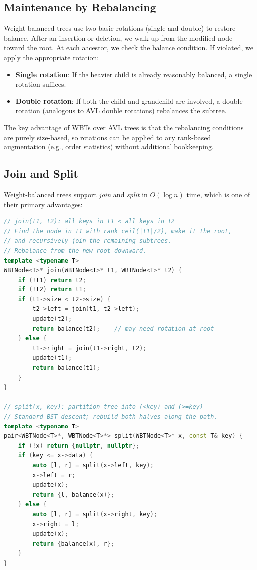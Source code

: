 \subsection{Maintenance by Rebalancing}
\label{sec:wbt-maintenance}

Weight-balanced trees use two basic rotations (single and double) to restore balance. After an insertion or deletion, we walk up from the modified node toward the root. At each ancestor, we check the balance condition. If violated, we apply the appropriate rotation:

\begin{itemize}
    \item \textbf{Single rotation}: If the heavier child is already reasonably balanced, a single rotation suffices.
    \item \textbf{Double rotation}: If both the child and grandchild are involved, a double rotation (analogous to AVL double rotations) rebalances the subtree.
\end{itemize}

The key advantage of WBTs over AVL trees is that the rebalancing conditions are purely size-based, so rotations can be applied to any rank-based augmentation (e.g., order statistics) without additional bookkeeping.

\subsection{Join and Split}
\label{sec:wbt-join-split}

Weight-balanced trees support \emph{join} and \emph{split} in $O(\log n)$ time, which is one of their primary advantages:

\begin{lstlisting}[language=C++]
// join(t1, t2): all keys in t1 < all keys in t2
// Find the node in t1 with rank ceil(|t1|/2), make it the root,
// and recursively join the remaining subtrees.
// Rebalance from the new root downward.
template <typename T>
WBTNode<T>* join(WBTNode<T>* t1, WBTNode<T>* t2) {
    if (!t1) return t2;
    if (!t2) return t1;
    if (t1->size < t2->size) {
        t2->left = join(t1, t2->left);
        update(t2);
        return balance(t2);    // may need rotation at root
    } else {
        t1->right = join(t1->right, t2);
        update(t1);
        return balance(t1);
    }
}

// split(x, key): partition tree into (<key) and (>=key)
// Standard BST descent; rebuild both halves along the path.
template <typename T>
pair<WBTNode<T>*, WBTNode<T>*> split(WBTNode<T>* x, const T& key) {
    if (!x) return {nullptr, nullptr};
    if (key <= x->data) {
        auto [l, r] = split(x->left, key);
        x->left = r;
        update(x);
        return {l, balance(x)};
    } else {
        auto [l, r] = split(x->right, key);
        x->right = l;
        update(x);
        return {balance(x), r};
    }
}
\end{lstlisting}

